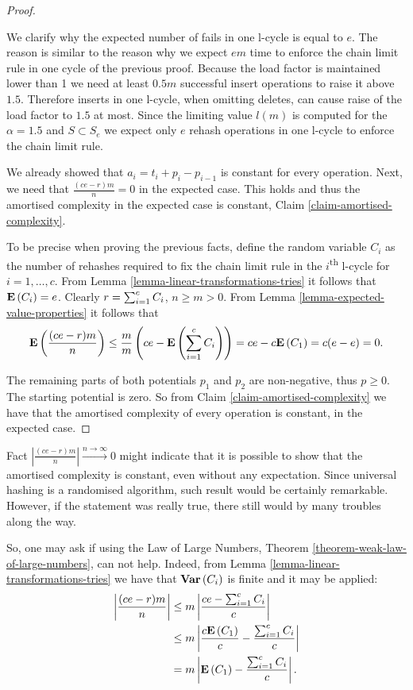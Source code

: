 \begin{proof}
\begin{itemize}
We clarify why the expected number of fails in one l-cycle is equal to $e$. The reason is similar to the reason why we expect $em$ time to enforce the chain limit rule in one cycle of the previous proof. Because the load factor is maintained lower than 1 we need at least $0.5 m$ successful insert operations to raise it above $1.5$. Therefore inserts in one l-cycle, when omitting deletes, can cause raise of the load factor to $1.5$ at most. Since the limiting value $l(m)$ is computed for the $\alpha = 1.5$ and $S \subset S_e$ we expect only $e$ rehash operations in one l-cycle to enforce the chain limit rule.
\end{itemize}

We already showed that $a_i = t_i + p_i - p_{i - 1}$ is constant for every operation. Next, we need that $\frac{(ce - r)m}{n} = 0 $ in the expected case. This holds and thus the amortised complexity in the expected case is constant, Claim \ref{claim-amortised-complexity}.

To be precise when proving the previous facts, define the random variable $C_i$ as the number of rehashes required to fix the chain limit rule in the $i$\textsuperscript{th} l-cycle for $i = 1, \dots, c$. From Lemma \ref{lemma-linear-transformations-tries} it follows that $\mathbf{E}\left(C_i\right) = e$. Clearly $r = \sum\displaylimits_{i = 1}^{c} C_i$, $n \geq m > 0$. From Lemma \ref{lemma-expected-value-properties} it follows that
\[
	\mathbf{E}\left(\frac{(ce - r)m}{n}\right) \leq \frac{m}{m}\left(ce - \mathbf{E}\left(\displaystyle\sum_{i = 1}^{c} C_i\right)\right) = ce - c\mathbf{E}\left(C_1\right) = c(e - e) = 0 \text{.}
\]

The remaining parts of both potentials $p_1$ and $p_2$ are non-negative, thus $p \geq 0$. The starting potential is zero. So from Claim \ref{claim-amortised-complexity} we have that the amortised complexity of every operation is constant, in the expected case.
\end{proof}

Fact $\left|\frac{(ce - r)m}{n}\right| \xrightarrow{n \rightarrow \infty} 0$ might indicate that it is possible to show that the amortised complexity is constant, even without any expectation. Since universal hashing is a randomised algorithm, such result would be certainly remarkable. However, if the statement was really true, there still would by many troubles along the way.

So, one may ask if using the Law of Large Numbers, Theorem \ref{theorem-weak-law-of-large-numbers}, can not help. Indeed, from Lemma \ref{lemma-linear-transformations-tries} we have that $\mathbf{Var}\left(C_i\right)$ is finite and it may be applied:
\[
\begin{split}
\left|\frac{(ce - r)m}{n}\right|
	& \leq m \left|\frac{ce - \sum\displaylimits_{i = 1}^{c} C_i}{c}\right| \\
	& \leq m \left|\frac{c\mathbf{E}\left(C_1\right)}{c} - \frac{\sum\displaylimits_{i = 1}^{c} C_i}{c}\right| \\
	& = m \left|\mathbf{E}\left(C_1\right) - \frac{\sum\displaylimits_{i = 1}^{c} C_i}{c}\right| \text{.}
\end{split}
\]

